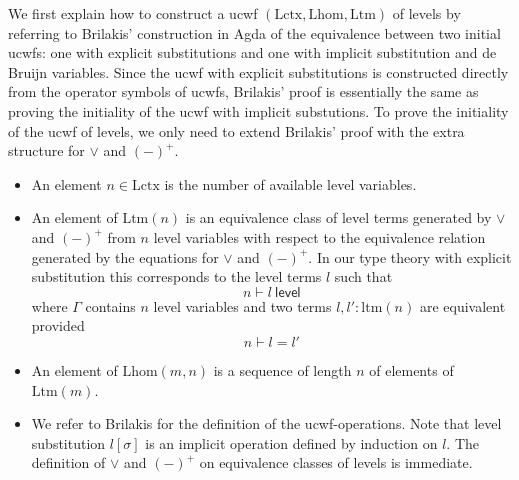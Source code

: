 \documentclass[11pt,a4paper]{article}
\theoremstyle{plain}
\theoremstyle{definition}
\newcommand{\level}{\mathsf{level}}
\newcommand{\Lctx}{\mathrm{Lctx}}
\newcommand{\Lsub}{\mathrm{Lhom}}
\newcommand{\Ltm}{\mathrm{Ltm}}
\def\lhom{\mathrm{lhom}}
\def\ltm{\mathrm{ltm}}
\def\lp{\mathrm{lp}}
\def\lq{\mathrm{lq}}
\def\s{\mathrm{s}}
\begin{document}
We first explain how to construct a ucwf $(\Lctx,\Lsub,\Ltm)$ of levels by referring to Brilakis'  \cite{Brilakis18} construction in Agda of the equivalence between two initial ucwfs: one with explicit substitutions and one with implicit substitution and de Bruijn variables. Since the ucwf with explicit substitutions is constructed directly from the operator symbols of ucwfs, Brilakis' proof is essentially the same as proving the initiality of the ucwf with implicit substutions. To prove the initiality of the ucwf of levels, we only need to extend Brilakis' proof with the extra structure for $\vee$ and $(-)^+$.
\begin{itemize}
\item An element $n \in \Lctx$ is the number of available level variables.
\item An element of $\Ltm(n)$ is an equivalence class of level terms generated by $\vee$ and $(-)^+$ from $n$ level variables with respect to the equivalence relation generated by the equations for $\vee$ and $(-)^+$. In our type theory with explicit substitution \cite{BezemCDE22} this corresponds to the level terms $l$ such that
$$
n \vdash l\ \level
$$
where $\Gamma$ contains $n$ level variables and two terms $l, l' : \ltm(n)$ are equivalent provided
$$
n \vdash l = l'
$$
\item An element of $\Lsub(m,n)$ is a sequence of length $n$ of elements of $\Ltm(m)$.
\item We refer to Brilakis for the definition of the ucwf-operations. Note that level substitution $l[\sigma]$ is an implicit operation defined by induction on $l$. The definition of $\vee$ and $(-)^+$ on equivalence classes of levels is immediate.
\end{itemize}
\end{document}
